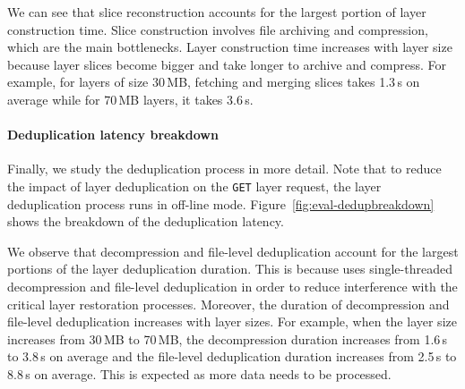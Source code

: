 We can see that slice reconstruction accounts for the largest portion of layer construction time.
%
Slice construction involves file archiving and compression, which are the main bottlenecks.
Layer construction time increases with layer size because layer slices become bigger and
take longer to archive and compress.
%
For example, for layers of size 30\,MB, fetching and merging slices takes 1.3\,s on average while
for 70\,MB layers, it takes 3.6\,s.

\paragraph{Deduplication latency breakdown}
%
Finally, we study the deduplication process in more detail.
%
Note that to reduce the impact of layer deduplication on the \texttt{GET} layer request,
the layer deduplication process runs in off-line mode.
%
Figure~\ref{fig:eval-dedupbreakdown} shows the breakdown of the deduplication latency.

We observe that decompression and file-level deduplication account for the largest portions of
the layer deduplication duration.
%
%
This is because \sysname uses single-threaded decompression and file-level deduplication in
order to reduce interference with the critical layer restoration processes.
%
%
Moreover, the duration of decompression and file-level deduplication increases with layer sizes.
%
For example, when the layer size increases from 30\,MB to 70\,MB, 
the decompression duration increases from 1.6\,s to 3.8\,s on average and the file-level deduplication duration increases from 2.5\,s to 8.8\,s on average.
%
This is expected as more data needs to be processed.


